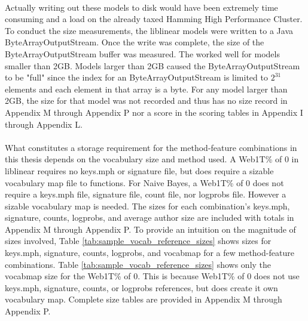 	\paragraph*{} Actually writing out these models to disk would have been extremely time consuming and a load on the already taxed Hamming High Performance Cluster.  To conduct the size measurements, the liblinear models were written to a Java ByteArrayOutputStream.  Once the write was complete, the size of the ByteArrayOutputStream buffer was measured.  The worked well for models smaller than 2GB.  Models larger than 2GB caused the ByteArrayOutputStream to be "full" since the index for an ByteArrayOutputStream is limited to $2^{31}$ elements and each element in that array is a byte.  For any model larger than 2GB, the size for that model was not recorded and thus has no size record in Appendix M through Appendix P nor a score in the scoring tables in Appendix I through Appendix L.
	\paragraph*{} What constitutes a storage requirement for the method-feature combinations in this thesis depends on the vocabulary size and method used.  A Web1T\% of 0 in liblinear requires no keys.mph or signature file, but does require a sizable vocabulary map file to functions.  For Naive Bayes, a Web1T\% of 0 does not require a keys.mph file, signature file, count file, nor logprobs file.  However a sizable vocabulary map is needed.  The sizes for each combination's keys.mph, signature, counts, logprobs, and average author size are included with totals in Appendix M through Appendix P.  To provide an intuition on the magnitude of sizes involved, Table \ref{tab:sample_vocab_reference_sizes} shows sizes for keys.mph, signature, counts, logprobs, and vocabmap for a few method-feature combinations.  Table \ref{tab:sample_vocab_reference_sizes} shows only the vocabmap size for the Web1T\% of 0.  This is because Web1T\% of 0 does not use keys.mph, signature, counts, or logprobs references, but does create it own vocabulary map.  Complete size tables are provided in Appendix M through Appendix P.
	

